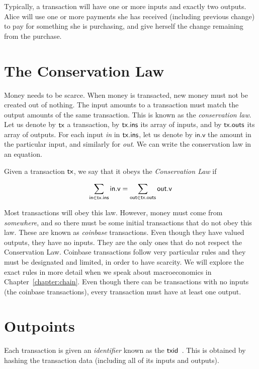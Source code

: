 Typically, a transaction will have one or more inputs and exactly two outputs. Alice will use
one or more payments she has received (including previous change) to pay for something she is
purchasing, and give herself the change remaining from the purchase.

\section{The Conservation Law}

Money needs to be scarce. When money is transacted, new money must not be created out of nothing.
The input amounts to a transaction must
match the output amounts of the same transaction. This is known as the \emph{conservation law}.
Let us denote by $\mathsf{tx}$ a transaction, by $\mathsf{tx}\textsf{.ins}$ its array of inputs,
and by $\mathsf{tx}\textsf{.outs}$ its array of outputs. For each input \emph{in} in
$\mathsf{tx}\textsf{.ins}$, let us denote by $\textsf{in.v}$ the amount in the particular
input, and similarly for \emph{out}. We can write the conservation law in an equation.

\begin{definition}
  Given a transaction $\mathsf{tx}$, we say that it obeys the \emph{Conservation Law} if

  \[
    \sum_{\textsf{in} \in \mathsf{tx}\textsf{.ins}} \textsf{in.v} = \sum_{\textsf{out} \in \mathsf{tx}\textsf{.outs}} \textsf{out.v}
  \]
\end{definition}

Most transactions will obey this law. However, money must come from \emph{somewhere},
and so there must be some initial transactions that do not obey this law. These are known as
\emph{coinbase} transactions. Even though they have valued outputs, they have no inputs. They
are the only ones that do not respect the Conservation Law.
Coinbase transactions follow very particular rules and they must be designated and limited,
in order to have scarcity.
We will explore the exact rules
in more detail when we speak about macroeconomics in Chapter~\ref{chapter:chain}.
Even though there can be transactions with no inputs (the coinbase transactions), every
transaction must have at least one output.

\section{Outpoints}

Each transaction is given an \emph{identifier} known as the \emph{$\mathsf{txid}$}~. This is
obtained by hashing the transaction data (including all of its inputs and outputs).

